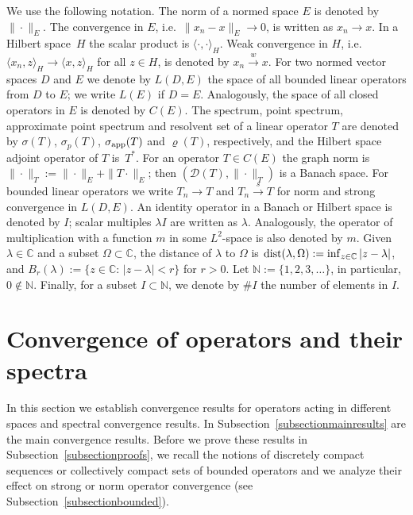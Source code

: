 \documentclass[a4paper,reqno]{amsart}
\begin{document}
{We use the following notation.
The norm of a normed space $E$ is denoted by~$\|\cdot \|_E$.
The convergence in $E$, i.e.\ $\|x_n-x\|_E\to 0$, is written as $x_n\to x$.
In a Hilbert space~$H$ the scalar product is $\langle\cdot,\cdot\rangle_H$.
Weak convergence in $H$, i.e.\ $\langle x_n,z\rangle_H\to \langle x,z\rangle _H$ for all $z\in H$, is denoted by $x_n\stackrel{w}{\to} x$.
For two normed vector spaces $D$ and $E$ we denote by $L(D,E)$ the space of all bounded linear operators from $D$ to $E$; we write $L(E)$ if $D=E$. 
Analogously, the space of all closed operators in $E$ is denoted by $C(E)$.
The spectrum, point spectrum, approximate point spectrum and resolvent set 
of a linear operator $T$ are denoted by $\sigma(T)$, $\sigma_p(T)$, $\sigma_{\rm app}(T)$ and $\varrho(T)$, 
respectively, and the Hilbert space adjoint operator of $T$ is~$T^*$.
For an operator $T\in C(E)$ the graph norm is $\|\cdot\|_T:=\|\cdot\|_E+\|T\cdot\|_E$; then $({\mathcal D}(T),\|\cdot\|_T)$ is a Banach space.
For bounded linear operators we write $T_n\to T$ and $T_n{\stackrel{s}{\rightarrow}} T$ for norm and strong convergence in $L(D,E)$.
An identity operator in a Banach or Hilbert space is denoted by $I$; scalar multiples $\lambda I$ are written as $\lambda$. Analogously, the 
operator of multiplication with a function $m$ in some $L^2$-space is also denoted by $m$.
Given $\lambda\in{\mathbb{C}}$ and a subset $\Omega\subset{\mathbb{C}}$, the distance of $\lambda$ to $\Omega$ is ${\rm dist}(\lambda,\Omega):=\inf_{z\in{\mathbb{C}}}|z-\lambda|$, 
and $B_r(\lambda):=\{z\in{\mathbb{C}}:\,|z-\lambda|<r\}$ for $r>0$.
Let ${\mathbb{N}}:=\{1,2,3,\dots\}$, in particular, $0\notin{\mathbb{N}}$. 
Finally, for a subset $I\subset{\mathbb{N}}$, we denote by $\# I$ the number of elements in $I$.

\section{Convergence of operators and their spectra}\label{sectionspectralconv}

In this section we establish convergence results for operators acting in different spaces and spectral convergence results.
In Subsection~\ref{subsectionmainresults} are the main convergence results. 
Before we prove these results  in Subsection~\ref{subsectionproofs}, we recall
the notions of discretely compact sequences or collectively compact sets of bounded operators 
and we analyze their effect on strong or norm operator convergence (see Subsection~\ref{subsectionbounded}).

}
\end{document}
